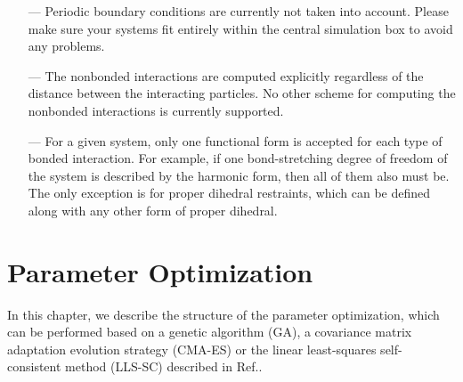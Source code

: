 \documentclass[10pt,a4paper,openany]{memoir}
\numberwithin{equation}{section}
\begin{document}
\begin{itemize}
\item[---] Periodic boundary conditions are currently not taken into
  account. Please make sure your systems fit entirely within the
  central simulation box to avoid any problems.
\item[---] The nonbonded interactions are computed explicitly
  regardless of the distance between the interacting particles. No
  other scheme for computing the nonbonded interactions is currently
  supported.
\item[---] For a given system, only one functional form is accepted
  for each type of bonded interaction. For example, if one
  bond-stretching degree of freedom of the system is described by the
  harmonic form, then all of them also must be. The only exception is
  for proper dihedral restraints, which can be defined along with any
  other form of proper dihedral.
\end{itemize}

\chapter{Parameter Optimization}
\label{chap:ga}

%
%
%

In this chapter, we describe the structure of the parameter
optimization, which can be performed based on a genetic algorithm
(GA), a covariance matrix adaptation evolution strategy (CMA-ES) or  
the linear least-squares self-consistent method (LLS-SC) described in
Ref.\cite{PAPER}.
\end{document}
